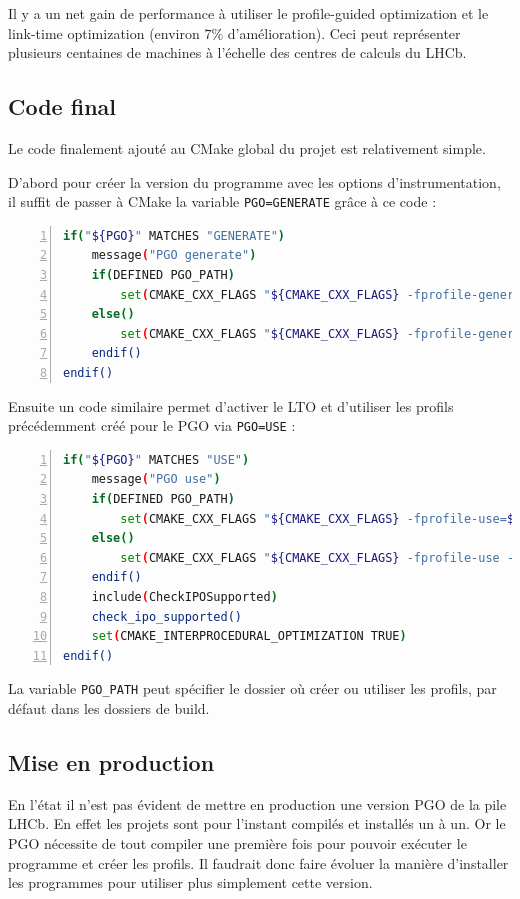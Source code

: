 \documentclass[a4paper,11pt]{report}
\begin{document}
Il y a un net gain de performance à utiliser le profile-guided optimization et le link-time optimization (environ $7\%$ d'amélioration).
Ceci peut représenter plusieurs centaines de machines à l'échelle des centres de calculs du LHCb.

\subsection{Code final}
Le code finalement ajouté au CMake global du projet est relativement simple.

D'abord pour créer la version du programme avec les options d'instrumentation, il suffit de passer à CMake la variable \verb'PGO=GENERATE' grâce à ce code :
\begin{lstlisting}[language=bash,numbers=left]
if("${PGO}" MATCHES "GENERATE")
	message("PGO generate")
	if(DEFINED PGO_PATH)
		set(CMAKE_CXX_FLAGS "${CMAKE_CXX_FLAGS} -fprofile-generate=${PGO_PATH}")
	else()
		set(CMAKE_CXX_FLAGS "${CMAKE_CXX_FLAGS} -fprofile-generate")
	endif()
endif()
\end{lstlisting}

Ensuite un code similaire permet d'activer le LTO et d'utiliser les profils précédemment créé pour le PGO via \verb'PGO=USE' :
\begin{lstlisting}[language=bash,numbers=left]
if("${PGO}" MATCHES "USE")
	message("PGO use")
	if(DEFINED PGO_PATH)
		set(CMAKE_CXX_FLAGS "${CMAKE_CXX_FLAGS} -fprofile-use=${PGO_PATH} -fprofile-correction")
	else()
		set(CMAKE_CXX_FLAGS "${CMAKE_CXX_FLAGS} -fprofile-use -fprofile-correction")
	endif()
	include(CheckIPOSupported)
	check_ipo_supported()
	set(CMAKE_INTERPROCEDURAL_OPTIMIZATION TRUE)
endif()
\end{lstlisting}

La variable \verb'PGO_PATH' peut spécifier le dossier où créer ou utiliser les profils, par défaut dans les dossiers de build.

\subsection{Mise en production}
En l'état il n'est pas évident de mettre en production une version PGO de la pile LHCb.
En effet les projets sont pour l'instant compilés et installés un à un.
Or le PGO nécessite de tout compiler une première fois pour pouvoir exécuter le programme et créer les profils.
Il faudrait donc faire évoluer la manière d'installer les programmes pour utiliser plus simplement cette version.
\end{document}
